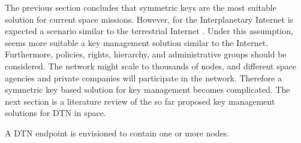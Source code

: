 The previous section concludes that symmetric keys are the most suitable solution for current space missions. However, for the Interplanetary Internet is expected a scenario similar to the terrestrial Internet \cite{rationale2010requirements}. Under this assumption, seems more suitable a key management solution similar to the Internet. Furthermore, policies, rights, hierarchy, and administrative groups should be considered. The network might scale to thousands of nodes, and different space agencies and private companies will participate in the network. Therefore a symmetric key based solution for key management becomes complicated.  The next section is a literature review of the so far proposed key management solutions for DTN in space.


A DTN endpoint is envisioned to contain one or more nodes.








